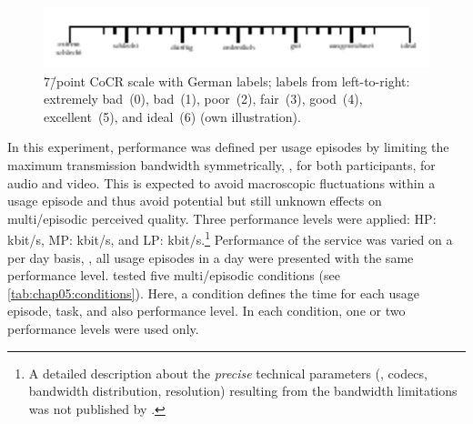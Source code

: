 \begin{figure}[bh]
	\includegraphics[width=1\textwidth]{figure/quality7pt_scale}
	\caption[7\=/point \acs{CoCR} scale]{7\=/point \acs{CoCR} scale with German labels; labels from left-to-right: extremely bad~(0), bad~(1), poor~(2), fair~(3), good~(4), excellent~(5), and ideal~(6) \citep[][p.\,19]{itu-t_recommendation_p.851_subjective_2003} (own illustration).}
	\label{img:chap05:quality-scale}
\end{figure}

In this experiment, performance was defined per usage episodes by limiting the maximum transmission bandwidth symmetrically, \ie, for both participants, for audio and video.
This is expected to avoid macroscopic fluctuations within a usage episode and thus avoid potential but still unknown effects on multi\-/episodic perceived quality.
Three performance levels were applied: \acf{HP}: \unit[500]{kbit/s}, \acf{MP}: \unit[150]{kbit/s}, and \acf{LP}: \unit[32]{kbit/s}.\footnote{A detailed description about the \emph{precise} technical parameters (\eg, codecs, bandwidth distribution, resolution) resulting from the bandwidth limitations was not published by \citet{moller_single-call_2011}.}
Performance of the service was varied on a per day basis, \ie, all usage episodes in a day were presented with the same performance level.
\citet{moller_single-call_2011} tested five multi\-/episodic conditions (see \autoref{tab:chap05:conditions}).
Here, a condition defines the time for each usage episode, task, and also performance level.
In each condition, one or two performance levels were used only.

